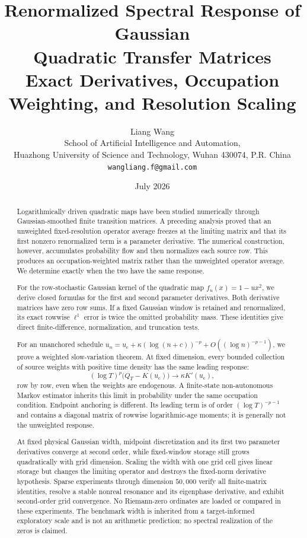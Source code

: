 \documentclass[11pt]{article}
\title{\textbf{Renormalized Spectral Response of Gaussian}\\
\textbf{Quadratic Transfer Matrices}\\
\large Exact Derivatives, Occupation Weighting, and Resolution Scaling}
\author{Liang Wang\\
\small School of Artificial Intelligence and Automation,\\[-0.2em]
\small Huazhong University of Science and Technology, Wuhan 430074, P.R. China\\
\small \texttt{wangliang.f@gmail.com}}
\date{July 2026}
\theoremstyle{definition}
\theoremstyle{remark}
\newcommand{\uc}{u_{\mathrm c}}
\begin{document}
\maketitle

\begin{abstract}
Logarithmically driven quadratic maps have been studied numerically through
Gaussian-smoothed finite transition matrices.  A preceding analysis proved
that an unweighted fixed-resolution operator average freezes at the limiting
matrix and that its first nonzero renormalized term is a parameter derivative.
The numerical construction, however, accumulates probability flow and then
normalizes each source row.  This produces an occupation-weighted matrix rather
than the unweighted operator average.  We determine exactly when the two have
the same response.

For the row-stochastic Gaussian kernel of the quadratic map
$f_u(x)=1-u x^2$, we derive closed formulas for the first and second parameter
derivatives.  Both derivative matrices have zero row sums.  If a fixed
Gaussian window is retained and renormalized, its exact rowwise
$\ell^1$ error is twice the omitted probability mass.  These identities give
direct finite-difference, normalization, and truncation tests.

For an unanchored schedule
$u_n=\uc+\kappa(\log(n+c))^{-p}+O((\log n)^{-p-1})$, we prove a weighted
slow-variation theorem.  At fixed dimension, every bounded collection of
source weights with positive time density has the same leading response:
\[
  (\log T)^p\bigl(Q_T-K(\uc)\bigr)\longrightarrow \kappa K'(\uc),
\]
row by row, even when the weights are endogenous.  A finite-state
non-autonomous Markov estimator inherits this limit in probability under the
same occupation condition.  Endpoint anchoring is different.  Its leading
term is of order $(\log T)^{-p-1}$ and contains a diagonal matrix of rowwise
logarithmic-age moments; it is generally not the unweighted response.

At fixed physical Gaussian width, midpoint discretization and its first two
parameter derivatives converge at second order, while fixed-window storage
still grows quadratically with grid dimension.  Scaling the width with one
grid cell gives linear storage but changes the limiting operator and destroys
the fixed-norm derivative hypothesis.  Sparse experiments through dimension
$50{,}000$ verify all finite-matrix identities, resolve a stable nonreal
resonance and its eigenphase derivative, and exhibit second-order grid
convergence.  No Riemann-zero ordinates are loaded or compared in these
experiments.  The benchmark width is inherited from a target-informed
exploratory scale and is not an arithmetic prediction; no spectral
realization of the zeros is claimed.
\end{abstract}
\end{document}
